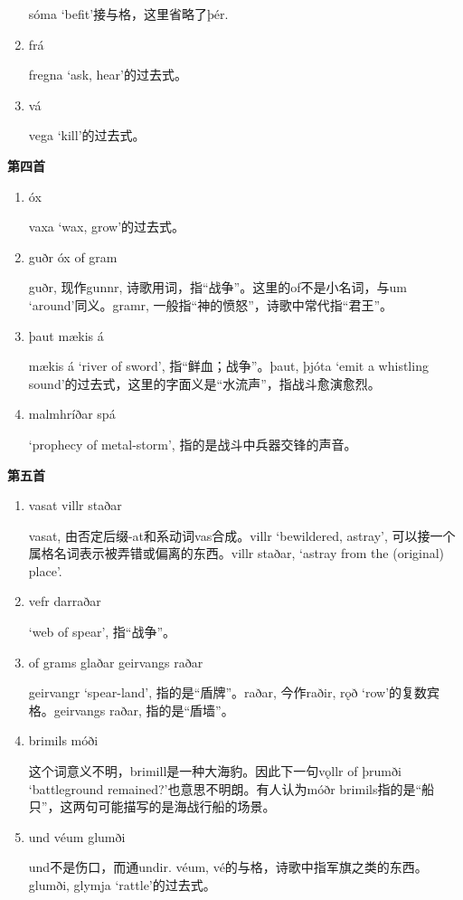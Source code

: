 \begin{grammar*}{}
\begin{enumerate}[leftmargin=*]
          sóma `befit'接与格，这里省略了þér.

    \item frá

          fregna `ask, hear'的过去式。
    \item vá

          vega `kill'的过去式。
  \end{enumerate}
  \textbf{第四首}
  \begin{enumerate}[leftmargin=*]
    \item óx

          vaxa `wax, grow'的过去式。
    \item guðr óx of gram

          guðr, 现作gunnr, 诗歌用词，指“战争”。这里的of不是小名词，与um `around'同义。gramr, 一般指“神的愤怒”，诗歌中常代指“君王”。

    \item þaut mækis á

          mækis á `river of sword', 指“鲜血；战争”。þaut, þjóta `emit a whistling sound'的过去式，这里的字面义是“水流声”，指战斗愈演愈烈。

    \item malmhríðar spá

          `prophecy of metal-storm', 指的是战斗中兵器交锋的声音。
  \end{enumerate}
  \textbf{第五首}
  \begin{enumerate}[leftmargin=*]
    \item vasat villr staðar

          vasat, 由否定后缀-at和系动词vas合成。villr `bewildered, astray', 可以接一个属格名词表示被弄错或偏离的东西。villr staðar, `astray from the (original) place'.

    \item vefr darraðar

          `web of spear', 指“战争”。
    \item of grams glaðar geirvangs raðar

          geirvangr `spear-land', 指的是“盾牌”。raðar, 今作raðir, rǫð `row'的复数宾格。geirvangs raðar, 指的是“盾墙”。

    \item brimils móði

          这个词意义不明，brimill是一种大海豹。因此下一句vǫllr of þrumði `battleground remained?'也意思不明朗。有人认为móðr brimils指的是“船只”，这两句可能描写的是海战行船的场景。

    \item und véum glumði

          und不是伤口，而通undir. véum, vé的与格，诗歌中指军旗之类的东西。glumði, glymja `rattle'的过去式。
  \end{enumerate}
\end{grammar*}
